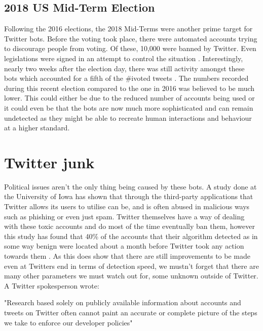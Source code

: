 \subsection{2018 US Mid-Term Election}
Following the 2016 elections, the 2018 Mid-Terms were another prime target for Twitter bots. Before the voting took place, there were automated accounts trying to discourage people from voting. Of these, 10,000 were banned by Twitter. Even legislations were signed in an attempt to control the situation \cite{BBC001}. Interestingly, nearly two weeks after the election day, there was still activity amongst these bots which accounted for a fifth of the \#ivoted tweets \cite{ETimes001}. The numbers recorded during this recent election compared to the one in 2016 was believed to be much lower. This could either be due to the reduced number of accounts being used or it could even be that the bots are now much more sophisticated and can remain undetected as they might be able to recreate human interactions and behaviour at a higher standard.

\section{Twitter junk}
Political issues aren't the only thing being caused by these bots. A study done at the University of Iowa has shown that through the third-party applications that Twitter allows its users to utilise can be, and is often abused in malicious ways such as phishing or even just spam. Twitter themselves have a way of dealing with these toxic accounts and do most of the time eventually ban them, however this study has found that 40\% of the accounts that their algorithm detected as in some way benign were located about a month before Twitter took any action towards them \cite{IOWA001}. As this does show that there are still improvements to be made even at Twitters end in terms of detection speed, we mustn't forget that there are many other parameters we must watch out for, some unknown outside of Twitter. A Twitter spokesperson wrote: 
\begin{displayquote}
	"Research based solely on publicly available information about accounts and tweets on Twitter often cannot paint an accurate or complete picture of the steps we take to enforce our developer policies" \cite{Wired001}
\end{displayquote}

